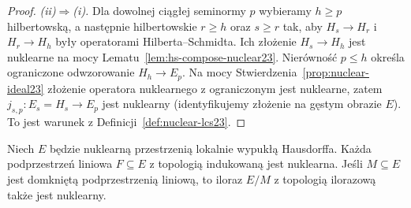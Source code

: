 \begin{proof}
\emph{(ii)$\Rightarrow$(i).} Dla dowolnej ciągłej seminormy
$p$ wybieramy $h\ge p$ hilbertowską, a następnie
hilbertowskie $r\ge h$ oraz $s\ge r$ tak, aby
$H_s\to H_r$ i $H_r\to H_h$ były operatorami
Hilberta--Schmidta. Ich złożenie $H_s\to H_h$ jest
nuklearne na mocy Lematu~\ref{lem:hs-compose-nuclear23}.
Nierówność $p\le h$ określa ograniczone odwzorowanie
$H_h\to E_p$. Na mocy Stwierdzenia~\ref{prop:nuclear-ideal23}
złożenie operatora nuklearnego z ograniczonym
jest nuklearne, zatem $j_{s,p}:E_s=H_s\to E_p$ jest
nuklearny (identyfikujemy złożenie na gęstym obrazie $E$). To jest warunek z Definicji~\ref{def:nuclear-lcs23}.
\end{proof}

\begin{twierdzenie}
\label{thm:nuclear-subquot23}
Niech $E$ będzie nuklearną przestrzenią lokalnie wypukłą
Hausdorffa. Każda podprzestrzeń liniowa $F\subseteq E$
z topologią indukowaną jest nuklearna. Jeśli $M\subseteq E$
jest domkniętą podprzestrzenią liniową, to iloraz $E/M$
z topologią ilorazową także jest nuklearny.
\end{twierdzenie}
